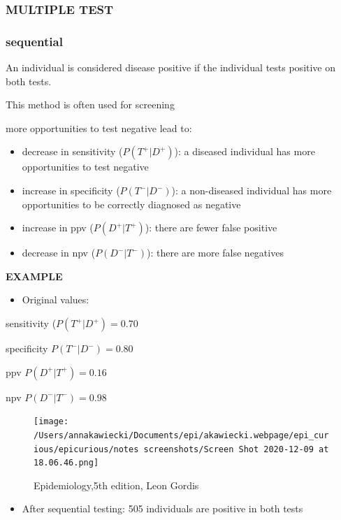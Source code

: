 \documentclass[
]{article}
\providecommand{\tightlist}{%
  \setlength{\itemsep}{0pt}\setlength{\parskip}{0pt}}
\begin{document}
\hypertarget{multiple-test}{%
\subsubsection{MULTIPLE TEST}\label{multiple-test}}

\hypertarget{sequential}{%
\subsubsection{sequential}\label{sequential}}

An individual is considered disease positive if the individual tests
positive on both tests.

This method is often used for screening

more opportunities to test negative lead to:

\begin{itemize}
\item
  decrease in sensitivity (\(P(T^+|D^+)\)): a diseased individual has
  more opportunities to test negative
\item
  increase in specificity (\(P(T^-|D^-)\)): a non-diseased individual
  has more opportunities to be correctly diagnosed as negative
\item
  increase in ppv (\(P(D^+|T^+)\)): there are fewer false positive
\item
  decrease in npv (\(P(D^-|T^-)\)): there are more false negatives
\end{itemize}

\textbf{EXAMPLE}

\begin{itemize}
\tightlist
\item
  Original values:
\end{itemize}

sensitivity (\(P(T^+|D^+)= 0.70\)

specificity \(P(T^-|D^-) = 0.80\)

ppv \(P(D^+|T^+)= 0.16\)

npv \(P(D^-|T^-) = 0.98\)

\begin{figure}
\centering
\texttt{[image: /Users/annakawiecki/Documents/epi/akawiecki.webpage/epi\_curious/epicurious/notes screenshots/Screen Shot 2020-12-09 at 18.06.46.png]}
\caption{Epidemiology,5th edition, Leon Gordis}
\end{figure}

\begin{itemize}
\tightlist
\item
  After sequential testing: 505 individuals are positive in both tests
\end{itemize}
\end{document}
